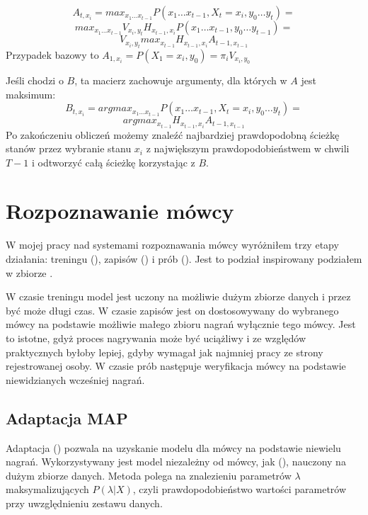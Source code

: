 $$A_{t,x_i} = max_{x_1 \dots x_{t-1}} P(x_1 \dots x_{t-1}, X_t = x_i, y_0 \dots y_t) =$$
$$max_{x_1 \dots x_{t-1}} V_{x_i, y_t} H_{x_{t-1}, x_i} P(x_1 \dots x_{t-1}, y_0 \dots y_{t-1}) =$$
$$V_{x_i, y_t} max_{x_{t-1}}H_{x_{t-1}, x_i} A_{t-1, x_{t-1}}$$
Przypadek bazowy to $A_{1,x_i} = P(X_1 = x_i, y_0) = \pi_i V_{x_i, y_0}$

Jeśli chodzi o $B$, ta macierz zachowuje argumenty, dla których w $A$ jest maksimum:
$$B_{t, x_i} = argmax_{x_1 \dots x_{t-1}} P(x_1 \dots x_{t-1}, X_t = x_i, y_0 \dots y_t) =$$
$$argmax_{x_{t-1}} H_{x_{t-1}, x_i} A_{t-1, x_{t-1}}$$
Po zakończeniu obliczeń możemy znaleźć najbardziej prawdopodobną ścieżkę stanów przez wybranie stanu $x_i$ z największym prawdopodobieństwem w chwili $T-1$ i odtworzyć całą ścieżkę korzystając z $B$\cite{aTutorialOnHidden}.

\section{Rozpoznawanie mówcy}\label{sec:rozpoznawanie_mowcy}

W mojej pracy nad systemami rozpoznawania mówcy wyróżniłem trzy etapy działania: treningu (),
zapisów () i prób (). Jest to podział inspirowany podziałem w zbiorze .

W czasie treningu model jest uczony na możliwie dużym zbiorze danych i przez być może długi czas. W czasie zapisów
jest on dostosowywany do wybranego mówcy na podstawie możliwie małego zbioru nagrań wyłącznie tego mówcy. Jest
to istotne, gdyż proces nagrywania może być uciążliwy i ze względów praktycznych byłoby lepiej, gdyby wymagał
jak najmniej pracy ze strony rejestrowanej osoby. W czasie prób następuje weryfikacja mówcy na podstawie niewidzianych
wcześniej nagrań.

\subsection{Adaptacja MAP}

Adaptacja  () pozwala na uzyskanie modelu dla mówcy na
podstawie niewielu nagrań. Wykorzystywany jest model niezależny
od mówcy, jak  (), nauczony na dużym zbiorze danych.
Metoda polega na znalezieniu parametrów $\lambda$
maksymalizujących $P(\lambda | X)$, czyli prawdopodobieństwo wartości parametrów przy uwzględnieniu zestawu danych.


